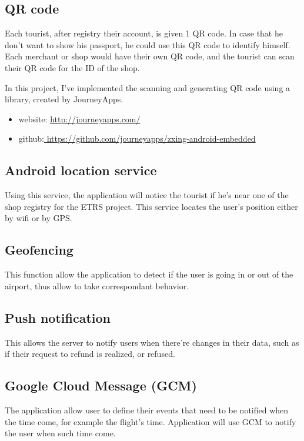 \subsection{QR code}
Each tourist, after registry their account, is given 1 QR code. In case that he don't want to show his passport, he could use this QR code to identify himself. Each merchant or shop would have their own QR code, and the tourist can scan their QR code for the ID of the shop. 

In this project, I've implemented the scanning and generating QR code using a library, created by JourneyApps.
\begin{itemize}
	\item website: \href{http://journeyapps.com/}{http://journeyapps.com/}
	\item github:\href{https://github.com/journeyapps/zxing-android-embedded}{ https://github.com/journeyapps/zxing-android-embedded}
\end{itemize}

\subsection{Android location service}
Using this service, the application will notice the tourist if he's near one of the shop registry for the ETRS project. This service locates the user's position either by wifi or by GPS.

\subsection{Geofencing}
This function allow the application to detect if the user is going in or out of the airport, thus allow to take correspondant behavior.

\subsection{Push notification}
This allows the server to notify users when there're changes in their data, such as if their request to refund is realized, or refused. 

\subsection{Google Cloud Message (GCM)}
The application allow user to define their events that need to be notified when the time come, for example the flight's time. Application will use GCM to notify the user when such time come.

